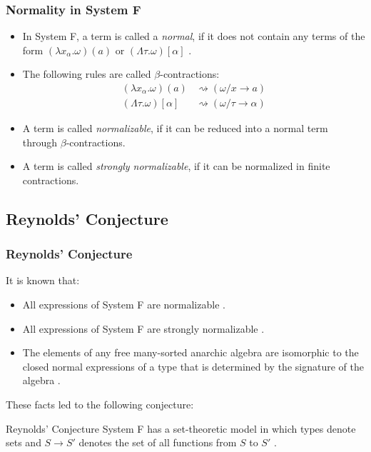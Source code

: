 \begin{frame}[fragile]
    \frametitle{Normality in System F}
  
    \begin{itemize}
        \item In System F, a term is called a \textit{normal}, if it does not contain any terms of the form $(\lambda x_\alpha. \omega)(a)$ or $(\Lambda \tau. \omega)[\alpha]$  \cite{capretta_valentini_1999}.
        \item The following rules are called $\beta$-contractions:
        \begin{align*}
            (\lambda x_\alpha. \omega)(a) &\rightsquigarrow (\omega / x \rightarrow a) \\
            (\Lambda \tau. \omega)[\alpha] &\rightsquigarrow (\omega / \tau \rightarrow \alpha)
        \end{align*}
        \item A term is called \textit{normalizable}, if it can be reduced into a normal term through $\beta$-contractions.
        \item A term is called \textit{strongly normalizable}, if it can be normalized in finite contractions.
    \end{itemize}
\end{frame}

\subsection{Reynolds' Conjecture}

\begin{frame}[fragile]
    \frametitle{Reynolds' Conjecture}
  
    It is known that:
    \begin{itemize}
        \item All expressions of System F are normalizable \cite{girard1972phd}.
        \item All expressions of System F are strongly normalizable \cite{PRAWITZ1971235}.
        \item The elements of any free many-sorted anarchic algebra are isomorphic to the closed normal expressions of a type that is determined by the signature of the algebra \cite{BOHM1985135}.
    \end{itemize}

    These facts led to the following conjecture:
    \begin{block}{Reynolds' Conjecture}
		System F has a set-theoretic model in which types denote sets and $S \rightarrow S'$ denotes the set of all functions from $S$ to $S'$ \cite{reynolds1983types}.
	\end{block}
\end{frame}


